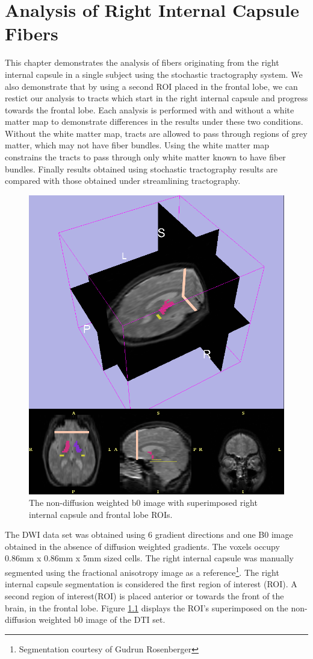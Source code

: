 \chapter{Analysis of Right Internal Capsule Fibers}
This chapter demonstrates the analysis of fibers originating from the right internal capsule in a single subject using the stochastic tractography system.  We also demonstrate that by using a second ROI placed in the frontal lobe, we can restict our analysis to tracts which start in the right internal capsule and progress towards the frontal lobe.  Each analysis is performed with and without a white matter map to demonstrate differences in the results under these two conditions.  Without the white matter map, tracts are allowed to pass through regions of grey matter, which may not have fiber bundles.  Using the white matter map constrains the tracts to pass through only white matter known to have fiber bundles.  Finally results obtained using stochastic tractography results are compared with those obtained under streamlining tractography.
\begin{figure}
  \center
	\includegraphics[width=0.5\linewidth]{slicer-0001}
	\caption{The non-diffusion weighted b0 image with superimposed right internal capsule and frontal lobe ROIs.}
	\label{fig:labelmap}
\end{figure}
The DWI data set was obtained using 6 gradient directions and one B0 image obtained in the absence of diffusion weighted gradients.  The voxels occupy 0.86mm x 0.86mm x 5mm sized cells. The right internal capsule was manually segmented using the fractional anisotropy image as a reference\footnote{Segmentation courtesy of Gudrun Rosenberger}.  The right internal capsule segmentation is considered the first region of interest (ROI).  A second region of interest(ROI) is placed anterior or towards the front of the brain, in the frontal lobe.  Figure \ref{fig:labelmap} displays the ROI's superimposed on the non-diffusion weighted b0 image of the DTI set.

